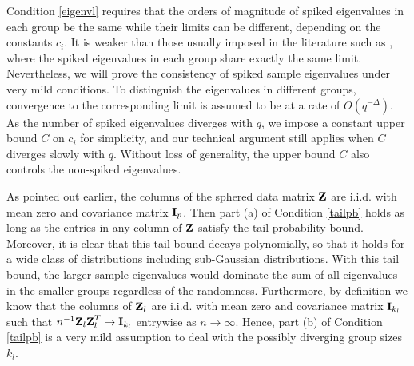 \documentclass{statsoc}
\newcommand{\bI}{\mbox{\bf I}}
\newcommand{\bZ}{\mbox{\bf Z}}
\def\t{^T}
\begin{document}
Condition \ref{eigenvl} requires that the orders of magnitude of spiked eigenvalues in each group be the same while their limits can be different, depending on the constants $c_i$. It is weaker than those usually imposed in the literature such as \cite{Shen2016}, where the spiked eigenvalues in each group share exactly the same limit. Nevertheless, we will prove the consistency of spiked sample eigenvalues under very mild conditions. To distinguish the eigenvalues in different groups, convergence to the corresponding limit is assumed to be at a rate of $O(q^{-\Delta})$. As the number of spiked eigenvalues diverges with $q$, we impose a constant upper bound $C$ on $c_i$ for simplicity, and our technical argument still applies when $C$ diverges slowly with $q$. Without loss of generality, the upper bound $C$ also controls the non-spiked eigenvalues.



As pointed out earlier, the columns of the sphered data matrix $\bZ$ are i.i.d. with mean zero and covariance matrix $\bI_p$. Then part (a) of Condition \ref{tailpb} holds as long as the entries in any column of $\bZ$ satisfy the tail probability bound. Moreover, it is clear that this tail bound decays polynomially, so that it holds for a wide class of distributions including sub-Gaussian distributions. With this tail bound, the larger sample eigenvalues would dominate the sum of all eigenvalues in the smaller groups regardless of the randomness. Furthermore, by definition we know that the columns of $\bZ_l$ are i.i.d. with mean zero and covariance matrix $\bI_{k_l}$ such that $n^{-1} \bZ_l \bZ_l\t \to \bI_{k_l}$ entrywise as $n \to \infty$. Hence, part (b) of Condition \ref{tailpb} is a very mild assumption to deal with the possibly diverging group sizes $k_l$.

\end{document}
